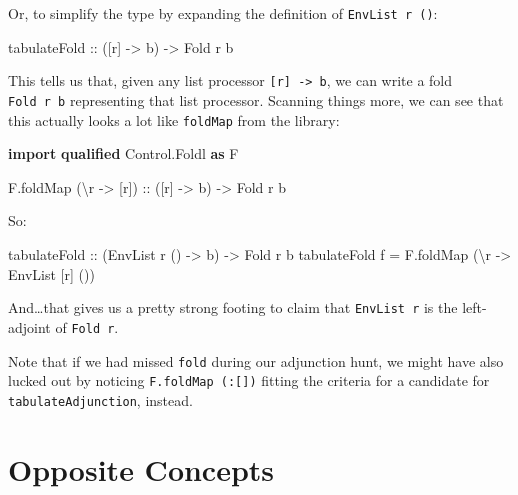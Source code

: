 \documentclass[]{article}
\newenvironment{Shaded}{}{}
\newcommand{\DataTypeTok}[1]{\textcolor[rgb]{0.56,0.13,0.00}{#1}}
\newcommand{\KeywordTok}[1]{\textcolor[rgb]{0.00,0.44,0.13}{\textbf{#1}}}
\newcommand{\NormalTok}[1]{#1}
\newcommand{\OtherTok}[1]{\textcolor[rgb]{0.00,0.44,0.13}{#1}}
\begin{document}
Or, to simplify the type by expanding the definition of \texttt{EnvList\ r\ ()}:

\begin{Shaded}
\begin{Highlighting}[]
\OtherTok{tabulateFold ::}\NormalTok{ ([r] }\OtherTok{{-}>}\NormalTok{ b) }\OtherTok{{-}>} \DataTypeTok{Fold}\NormalTok{ r b}
\end{Highlighting}
\end{Shaded}

This tells us that, given any list processor
\texttt{{[}r{]}\ -\textgreater{}\ b}, we can write a fold \texttt{Fold\ r\ b}
representing that list processor. Scanning things more, we can see that this
actually looks a lot like \texttt{foldMap} from the library:

\begin{Shaded}
\begin{Highlighting}[]
\KeywordTok{import} \KeywordTok{qualified} \DataTypeTok{Control.Foldl} \KeywordTok{as} \DataTypeTok{F}

\NormalTok{F.foldMap (\textbackslash{}r }\OtherTok{{-}>}\NormalTok{ [r])}
\OtherTok{    ::}\NormalTok{ ([r] }\OtherTok{{-}>}\NormalTok{ b)}
    \OtherTok{{-}>} \DataTypeTok{Fold}\NormalTok{ r b}
\end{Highlighting}
\end{Shaded}

So:

\begin{Shaded}
\begin{Highlighting}[]
\OtherTok{tabulateFold ::}\NormalTok{ (}\DataTypeTok{EnvList}\NormalTok{ r () }\OtherTok{{-}>}\NormalTok{ b) }\OtherTok{{-}>} \DataTypeTok{Fold}\NormalTok{ r b}
\NormalTok{tabulateFold f }\OtherTok{=}\NormalTok{ F.foldMap (\textbackslash{}r }\OtherTok{{-}>} \DataTypeTok{EnvList}\NormalTok{ [r] ())}
\end{Highlighting}
\end{Shaded}

And\ldots that gives us a pretty strong footing to claim that
\texttt{EnvList\ r} is the left-adjoint of \texttt{Fold\ r}.

Note that if we had missed \texttt{fold} during our adjunction hunt, we might
have also lucked out by noticing \texttt{F.foldMap\ (:{[}{]})} fitting the
criteria for a candidate for \texttt{tabulateAdjunction}, instead.

\hypertarget{opposite-concepts}{%
\section{Opposite Concepts}\label{opposite-concepts}}
\end{document}
